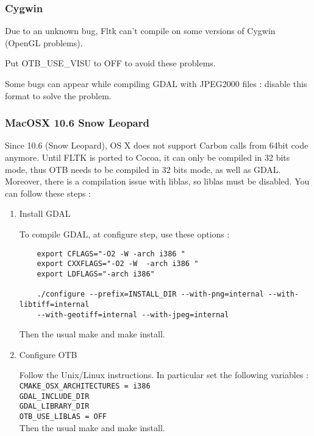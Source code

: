 \subsubsection{Cygwin}
Due to an unknown bug, Fltk can't compile on some versions of Cygwin (OpenGL problems).

Put OTB\_USE\_VISU to OFF to avoid these problems.

Some bugs can appear while compiling GDAL with JPEG2000 files : disable this format to solve the problem.

\subsubsection{MacOSX 10.6 Snow Leopard}
Since 10.6 (Snow Leopard), OS X does not support Carbon calls from 64bit code anymore. Until FLTK is ported to Cocoa, it can only be compiled in 32 bits mode, thus OTB needs to be compiled in 32 bits mode, as well as GDAL. Moreover, there is a compilation issue with liblas, so liblas must be disabled.
You can follow these steps :

\begin{enumerate}

\item Install GDAL

	To compile GDAL, at configure step, use these options :
\begin{verbatim}
	export CFLAGS="-O2 -W -arch i386 "
	export CXXFLAGS="-O2 -W  -arch i386 "
	export LDFLAGS="-arch i386"

	./configure --prefix=INSTALL_DIR --with-png=internal --with-libtiff=internal
	--with-geotiff=internal --with-jpeg=internal
\end{verbatim}

	Then the usual make and make install.


\item Configure OTB

        Follow the Unix/Linux instructions. In particular set the following variables :
        \texttt{CMAKE\_OSX\_ARCHITECTURES = i386}\\
        \texttt{GDAL\_INCLUDE\_DIR}\\
        \texttt{GDAL\_LIBRARY\_DIR}\\
        \texttt{OTB\_USE\_LIBLAS = OFF}\\

        Then the usual make and make install.

\end{enumerate}

